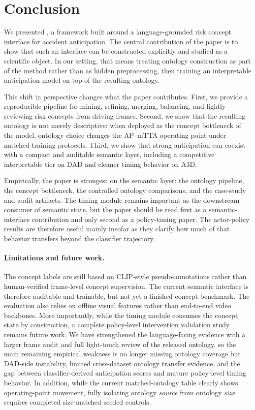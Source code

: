 \section{Conclusion}
\label{sec:conclusion}

We presented \method{}, a framework built around a language-grounded risk
concept interface for accident anticipation. The central contribution of the
paper is to show that such an interface can be constructed explicitly and
studied as a scientific object. In our setting, that means treating ontology
construction as part of the method rather than as hidden preprocessing, then
training an interpretable anticipation model on top of the resulting ontology.

This shift in perspective changes what the paper contributes. First, we provide
a reproducible pipeline for mining, refining, merging, balancing, and lightly
reviewing risk concepts from driving frames. Second, we show that the resulting
ontology is not merely descriptive: when deployed as the concept bottleneck of
the model, ontology choice changes the AP--mTTA operating point under matched
training protocols. Third, we show that strong anticipation can coexist with a compact
and auditable semantic layer, including a competitive interpretable tier on DAD
and cleaner timing behavior on A3D.

Empirically, the paper is strongest on the semantic layer: the ontology
pipeline, the concept bottleneck, the controlled ontology comparisons, and the
case-study and audit artifacts. The timing module remains important as the
downstream consumer of semantic state, but the paper should be read first as a
semantic-interface contribution and only second as a policy-timing paper. The
actor-policy results are therefore useful mainly insofar as they clarify how
much of that behavior transfers beyond the classifier trajectory.

\paragraph{Limitations and future work.}
The concept labels are still based on CLIP-style pseudo-annotations rather than
human-verified frame-level concept supervision. The current semantic interface
is therefore auditable and trainable, but not yet a finished concept benchmark.
The evaluation also relies on offline visual features rather than end-to-end
video backbones. More importantly, while the timing module consumes the concept
state by construction, a complete policy-level intervention validation study
remains future work. We have strengthened the language-facing evidence with a
larger frame audit and full light-touch review of the released ontology, so the
main remaining empirical weakness is no longer missing ontology coverage but
DAD-side instability, limited cross-dataset ontology transfer evidence, and the
gap between classifier-derived anticipation scores and mature policy-level
timing behavior.
In addition, while the current matched-ontology table clearly shows operating-point
movement, fully isolating ontology \emph{source} from ontology \emph{size}
requires completed size-matched seeded controls.

